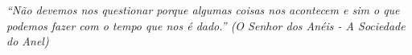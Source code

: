 \begin{epigrafe}
    \vspace*{\fill}
    \begin{flushright}
        \textit{``Não devemos nos questionar porque 
        algumas coisas nos acontecem e sim o que podemos 
        fazer com o tempo que nos é dado.''
        (O Senhor dos Anéis - A Sociedade do Anel)}
    \end{flushright}
    
\end{epigrafe}

\pagebreak